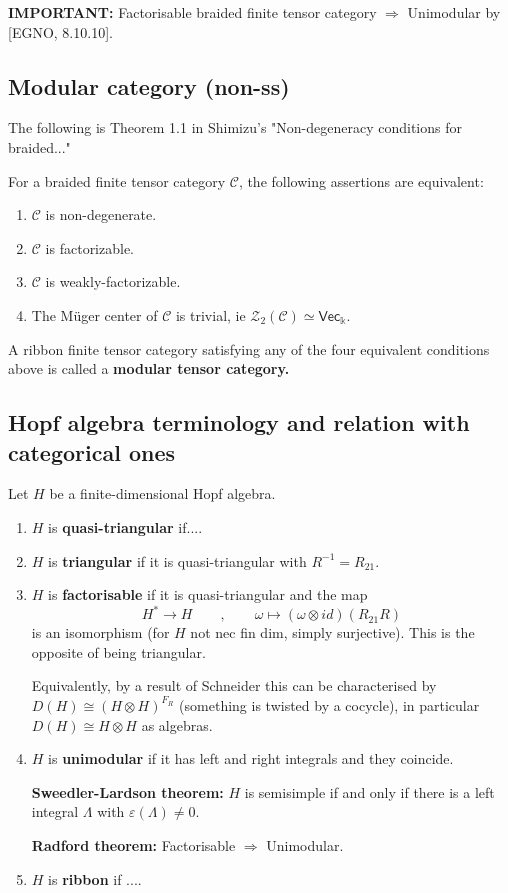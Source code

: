 \documentclass[11pt]{article}
\newcommand{\C}{\mathcal{C}}
\theoremstyle{definition}
\begin{document}
\textbf{IMPORTANT:} Factorisable braided finite tensor category $\Rightarrow$ Unimodular by [EGNO, 8.10.10].


\subsection{Modular category (non-ss)}


The following is Theorem 1.1 in Shimizu's "Non-degeneracy conditions for braided..."


For a braided finite tensor category $\mathcal{C}$, the following assertions are equivalent:
\begin{enumerate}
    \item $\mathcal{C}$ is non-degenerate.
    \item $\mathcal{C}$ is factorizable.
    \item $\mathcal{C}$ is weakly-factorizable.
    \item The M\"{u}ger center of $\mathcal{C}$ is trivial, ie $\mathcal{Z}_2(\C) \simeq \mathsf{Vec}_\Bbbk$.
\end{enumerate}


A ribbon finite tensor category satisfying any of the four equivalent conditions above is called a \textbf{modular tensor category.}



\subsection{Hopf algebra terminology and relation with categorical ones}



Let $H$ be a finite-dimensional Hopf algebra.


\begin{enumerate}
\item $H$ is \textbf{quasi-triangular} if....
\item $H$ is \textbf{triangular} if it is quasi-triangular with $R^{-1}=R_{21}$.
\item $H$ is \textbf{factorisable} if it is quasi-triangular and the map $$ H^* \to H \qquad , \qquad \omega \mapsto (\omega \otimes id)(R_{21}R) $$ is an isomorphism (for $H$ not nec fin dim, simply surjective). This is the opposite of being triangular.


Equivalently,  by a result of Schneider this can be characterised by $D(H)\cong (H \otimes H)^{F_R}$ (something is twisted by a cocycle), in particular   $D(H)\cong H \otimes H$ as algebras.

\item $H$ is \textbf{unimodular} if it has left and right integrals and they coincide.

\textbf{Sweedler-Lardson theorem:} $H$ is semisimple if and only if there is a left integral $\Lambda$ with $\varepsilon(\Lambda) \neq 0$.

\textbf{Radford theorem:} Factorisable $\Rightarrow$ Unimodular.


\item $H$ is \textbf{ribbon} if ....
\end{enumerate}
\end{document}
